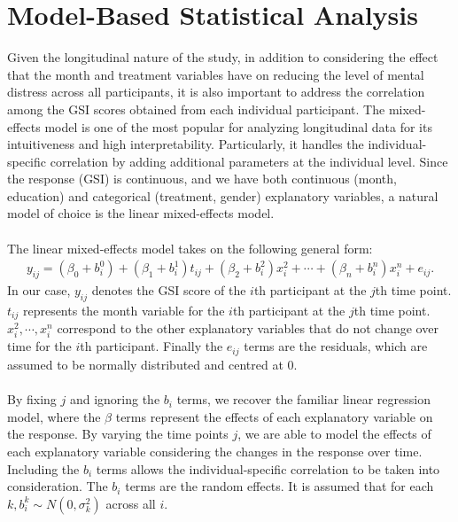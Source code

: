 \section{Model-Based Statistical Analysis} \label{sec:confirmatory}
Given the longitudinal nature of the study, in addition to considering the effect that the month and treatment variables have on reducing the level of mental distress across all participants, it is also important to address the correlation among the GSI scores obtained from each individual participant. The mixed-effects model is one of the most popular for analyzing longitudinal data for its intuitiveness and high interpretability. Particularly, it handles the individual-specific correlation by adding additional parameters at the individual level. Since the response (GSI) is continuous, and we have both continuous (month, education) and categorical (treatment, gender) explanatory variables, a natural model of choice is the linear mixed-effects model.\\\\
The linear mixed-effects model takes on the following general form:
\begin{align}
y_{ij} = (\beta_0 + b^0_i) + (\beta_1 + b^1_i)t_{ij} + (\beta_2 + b^2_i)x^2_i + \cdots + (\beta_n + b^n_i)x^n_i + e_{ij}. \label{eq:lme}
\end{align}
In our case, $y_{ij}$ denotes the GSI score of the $i$th participant at the $j$th time point. $t_{ij}$ represents the month variable for the $i$th participant at the $j$th time point. $x^2_i,\cdots,x^n_i$ correspond to the other explanatory variables that do not change over time for the $i$th participant. Finally the $e_{ij}$ terms are the residuals, which are assumed to be normally distributed and centred at $0$.\\\\
By fixing $j$ and ignoring the $b_i$ terms, we recover the familiar linear regression model, where the $\beta$ terms represent the effects of each explanatory variable on the response. By varying the time points $j$, we are able to model the effects of each explanatory variable considering the changes in the response over time. Including the $b_i$ terms allows the individual-specific correlation to be taken into consideration. The $b_i$ terms are the random effects. It is assumed that for each $k, b_i^k\sim N(0, \sigma^2_k)$ across all $i$.\\\\
